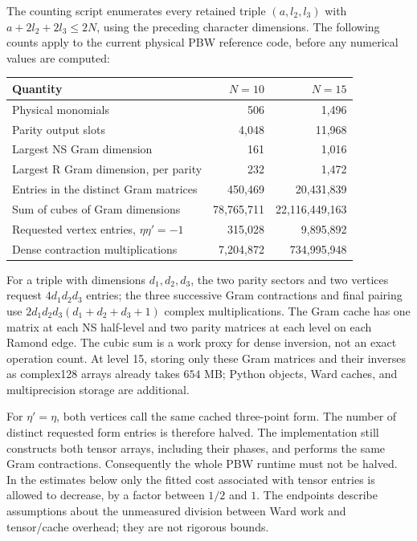The counting script enumerates every retained triple $(a,l_2,l_3)$ with
$a+2l_2+2l_3\le 2N$, using the preceding character dimensions.  The following
counts apply to the current physical PBW reference code, before any numerical
values are computed:
\begin{center}
\begin{tabular}{lrr}
\toprule
Quantity & $N=10$ & $N=15$\\
\midrule
Physical monomials & 506 & 1,496\\
Parity output slots & 4,048 & 11,968\\
Largest NS Gram dimension & 161 & 1,016\\
Largest R Gram dimension, per parity & 232 & 1,472\\
Entries in the distinct Gram matrices & 450,469 & 20,431,839\\
Sum of cubes of Gram dimensions & 78,765,711 & 22,116,449,163\\
Requested vertex entries, $\eta\eta'=-1$ & 315,028 & 9,895,892\\
Dense contraction multiplications & 7,204,872 & 734,995,948\\
\bottomrule
\end{tabular}
\end{center}
For a triple with dimensions $d_1,d_2,d_3$, the two parity sectors and two
vertices request $4d_1d_2d_3$ entries; the three successive Gram contractions
and final pairing use $2d_1d_2d_3(d_1+d_2+d_3+1)$ complex multiplications.
The Gram cache has one matrix at each NS half-level and two parity matrices
at each level on each Ramond edge.  The cubic sum is a work proxy for dense
inversion, not an exact operation count.  At level 15, storing only these
Gram matrices and their inverses as complex128 arrays already takes
$654$ MB; Python objects, Ward caches, and multiprecision storage are additional.

For $\eta'=\eta$, both vertices call the same cached three-point form.
The number of distinct requested form entries is therefore halved.  The
implementation still constructs both tensor arrays, including their phases,
and performs the same Gram contractions.  Consequently the whole PBW runtime
must not be halved.  In the estimates below only the fitted cost associated
with tensor entries is allowed to decrease, by a factor between $1/2$ and $1$.
The endpoints describe assumptions about the unmeasured division between Ward
work and tensor/cache overhead; they are not rigorous bounds.

